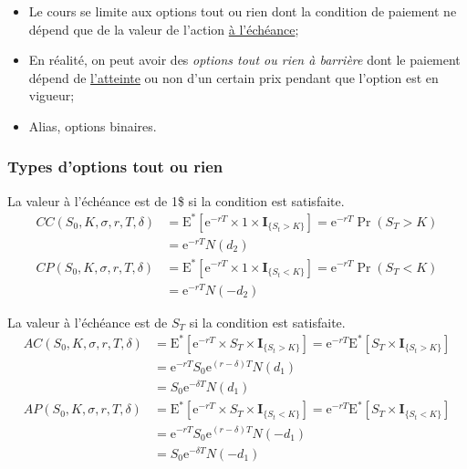 \documentclass[10pt, french]{article}
\begin{document}
\begin{multicols*}{2}
\begin{definitionNOHFILL}
\tcbline

\begin{itemize}[leftmargin = *]
	\item	Le cours se limite aux options tout ou rien dont la condition de paiement ne dépend que de la valeur de l'action \underline{à l'échéance};
	\item	En réalité, on peut avoir des \textit{options tout ou rien à barrière} dont le paiement dépend de \underline{l'atteinte} ou non d'un certain prix pendant que l'option est en vigueur;
	\item	Alias, options binaires.
\end{itemize}
\end{definitionNOHFILL}


\subsubsection{Types d'options tout ou rien}
\begin{definitionNOHFILLsub}
La valeur à l'échéance est de 1\$ si la condition est satisfaite.\\

\begin{align*}
	CC(S_{0}, K, \sigma, r, T, \delta)
	&=	\text{E}^{*}[\textrm{e}^{-rT} \times 1	\times	\bm{I}_{\{S_{t}	>	K\}}]
	=	\textrm{e}^{-rT} \Pr(S_{T}	>	K)	\\
	&=	\textrm{e}^{-rT} N(d_{2})	\\
	CP(S_{0}, K, \sigma, r, T, \delta)
	&=	\text{E}^{*}[\textrm{e}^{-rT} \times	1	\times	\bm{I}_{\{S_{t}	<	K\}}]
	=	\textrm{e}^{-rT} \Pr(S_{T}	<	K)	\\
	&=	\textrm{e}^{-rT} N(-d_{2})	
\end{align*}
\end{definitionNOHFILLsub}

\begin{definitionNOHFILLsub}
La valeur à l'échéance est de $S_{T}$ si la condition est satisfaite.\\

\begin{align*}
	AC(S_{0}, K, \sigma, r, T, \delta)
	&=	\text{E}^{*}[\textrm{e}^{-rT} \times S_{T}	\times	\bm{I}_{\{S_{t}	>	K\}}]	
	=	\textrm{e}^{-rT} \text{E}^{*}[S_{T}	\times	\bm{I}_{\{S_{t}	>	K\}}]	\\
	&=	\textrm{e}^{-rT} S_{0} \textrm{e}^{(r	-	\delta)T}N(d_{1})	\\
	&=	S_{0} \textrm{e}^{-\delta T}N(d_{1})	\\
	AP(S_{0}, K, \sigma, r, T, \delta)
	&=	\text{E}^{*}[\textrm{e}^{-rT} \times S_{T}	\times	\bm{I}_{\{S_{t}	<	K\}}]	
	=	\textrm{e}^{-rT} \text{E}^{*}[S_{T}	\times	\bm{I}_{\{S_{t}	<	K\}}]	\\
	&=	\textrm{e}^{-rT} S_{0} \textrm{e}^{(r	-	\delta)T}N(-d_{1})	\\
	&=	S_{0} \textrm{e}^{-\delta T}N(-d_{1})	
\end{align*}
\end{definitionNOHFILLsub}


\end{multicols*}
\end{document}
